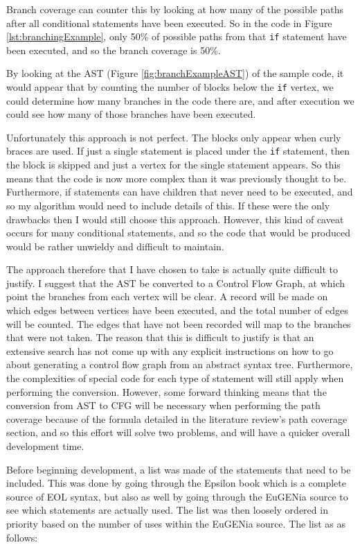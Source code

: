 Branch coverage can counter this by looking at how many of the possible paths after all conditional statements have been executed. So in the code in Figure \ref{lst:branchingExample}, only 50\% of possible paths from that \verb|if| statement have been executed, and so the branch coverage is 50\%.

By looking at the AST (Figure \ref{fig:branchExampleAST}) of the sample code, it would appear that by counting the number of blocks below the \verb|if| vertex, we could determine how many branches in the code there are, and after execution we could see how many of those branches have been executed.

Unfortunately this approach is not perfect. The blocks only appear when curly braces are used. If just a single statement is placed under the \verb|if| statement, then the block is skipped and just a vertex for the single statement appears. So this means that the code is now more complex than it was previously thought to be. Furthermore, if statements can have children that never need to be executed, and so my algorithm would need to include details of this. If these were the only drawbacks then I would still choose this approach. However, this kind of caveat occurs for many conditional statements, and so the code that would be produced would be rather unwieldy and difficult to maintain.

The approach therefore that I have chosen to take is actually quite difficult to justify. I suggest that the AST be converted to a Control Flow Graph, at which point the branches from each vertex will be clear. A record will be made on which edges between vertices have been executed, and the total number of edges will be counted. The edges that have not been recorded will map to the branches that were not taken. The reason that this is difficult to justify is that an extensive search has not come up with any explicit instructions on how to go about generating a control flow graph from an abstract syntax tree. Furthermore, the complexities of special code for each type of statement will still apply when performing the conversion. However, some forward thinking means that the conversion from AST to CFG will be necessary when performing the path coverage because of the formula detailed in the literature review's path coverage section, and so this effort will solve two problems, and will have a quicker overall development time.

Before beginning development, a list was made of the statements that need to be included. This was done by going through the Epsilon book \citep{epsilonBook} which is a complete source of EOL syntax, but also as well by going through the EuGENia source to see which statements are actually used. The list was then loosely ordered in priority based on the number of uses within the EuGENia source. The list as as follows:

